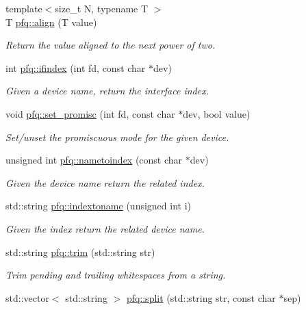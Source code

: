 \begin{DoxyCompactItemize}
\item 
{\footnotesize template$<$size\+\_\+t N, typename T $>$ }\\T \hyperlink{namespacepfq_a9db75e7163c5f764248401d10a2a3f9b}{pfq\+::align} (T value)
\begin{DoxyCompactList}\small\item\em Return the value aligned to the next power of two. \end{DoxyCompactList}\item 
int \hyperlink{namespacepfq_a251ac5cc269aa123009754edf62ab8b4}{pfq\+::ifindex} (int fd, const char $\ast$dev)
\begin{DoxyCompactList}\small\item\em Given a device name, return the interface index. \end{DoxyCompactList}\item 
void \hyperlink{namespacepfq_a62b9f1831dc714353f6edcb66a4fad4d}{pfq\+::set\+\_\+promisc} (int fd, const char $\ast$dev, bool value)
\begin{DoxyCompactList}\small\item\em Set/unset the promiscuous mode for the given device. \end{DoxyCompactList}\item 
unsigned int \hyperlink{namespacepfq_a55d90c336462015bb2b4e40f9f853847}{pfq\+::nametoindex} (const char $\ast$dev)
\begin{DoxyCompactList}\small\item\em Given the device name return the related index. \end{DoxyCompactList}\item 
std\+::string \hyperlink{namespacepfq_a7bf753b90ae15e20c86f40ba59c87c36}{pfq\+::indextoname} (unsigned int i)
\begin{DoxyCompactList}\small\item\em Given the index return the related device name. \end{DoxyCompactList}\item 
std\+::string \hyperlink{namespacepfq_a02a1861a64cc518394d3cc4361799c9f}{pfq\+::trim} (std\+::string str)
\begin{DoxyCompactList}\small\item\em Trim pending and trailing whitespaces from a string. \end{DoxyCompactList}\item 
std\+::vector$<$ std\+::string $>$ \hyperlink{namespacepfq_a0c3aeb61dfd544cb08cb240202caf213}{pfq\+::split} (std\+::string str, const char $\ast$sep)

\end{DoxyCompactItemize}
